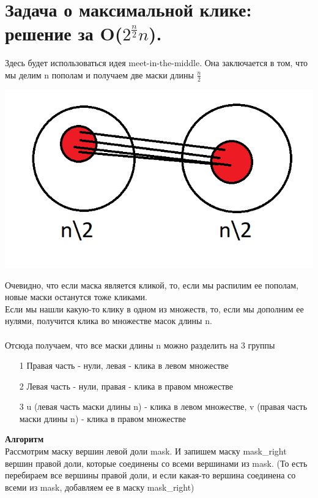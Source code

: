 \setcounter{section}{21}
\section{Задача о максимальной клике: решение за O($2^{\frac{n}{2}} n$).}
 Здесь будет использоваться идея meet-in-the-middle. Она заключается в том, что мы делим n пополам и получаем две маски длины $\frac{n}{2}$
 \begin{center}
     \includegraphics[width=17cm]{images/18-24_alg2.PNG}
 \end{center}
  Очевидно, что если маска является кликой, то, если мы распилим ее пополам, новые маски останутся тоже кликами.\\  Если мы нашли какую-то клику в одном из множеств, то, если мы дополним ее нулями, получится клика во множестве масок длины n.
  \\
  \\ Отсюда получаем, что все маски длины n можно разделить на 3 группы
  \begin{itemize}
      \item [1] Правая часть - нули, левая - клика в левом множестве
      \item [2] Левая часть - нули, правая - клика в правом множестве
      \item[3] u (левая часть маски длины n) - клика в левом множестве, v (правая часть маски длины n) - клика в правом множестве
  \end{itemize}
\textbf{Алгоритм} \\
Рассмотрим маску вершин левой доли mask. И запишем маску mask\_right вершин правой доли, которые соединены со всеми вершинами из mask. (То есть перебираем все вершины правой доли, и если какая-то вершина соединена со всеми из mask, добавляем ее в маску mask\_right)
\\
